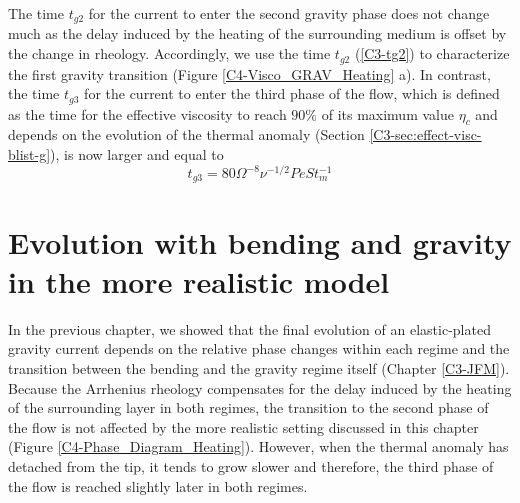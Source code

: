 The time  $t_{g2}$ for the current  to enter the second  gravity phase
does  not change  much as  the  delay induced  by the  heating of  the
surrounding medium is offset by  the change in rheology.  Accordingly,
we  use the  time $t_{g2}$  (\ref{C3-tg2}) to  characterize the  first
gravity   transition  (Figure   \ref{C4-Visco_GRAV_Heating}  a).    In
contrast, the time  $t_{g3}$ for the current to enter  the third phase
of the flow, which is defined  as the time for the effective viscosity
to  reach $90\%$  of its  maximum value  $\eta_c$ and  depends on  the
evolution       of       the      thermal       anomaly       (Section
\ref{C3-sec:effect-visc-blist-g}), is now larger and equal to
\begin{equation}
  t_{g3}= 80 \Omega^{-8}\nu^{-1/2}Pe St_m^{-1}
  \label{C4-tg3}
\end{equation}

\section{Evolution  with bending  and  gravity in  the more  realistic
  model}
\label{C4-sec:evol-with-bend}

In the  previous chapter,  we showed  that the  final evolution  of an
elastic-plated gravity  current depends on the  relative phase changes
within  each regime  and the  transition between  the bending  and the
gravity regime  itself (Chapter  \ref{C3-JFM}). Because  the Arrhenius
rheology  compensates for  the delay  induced  by the  heating of  the
surrounding layer in both regimes,  the transition to the second phase
of the flow is not affected by the more realistic setting discussed in
this  chapter (Figure  \ref{C4-Phase_Diagram_Heating}). However,  when
the thermal anomaly has detached from the tip, it tends to grow slower
and therefore, the  third phase of the flow is  reached slightly later
in both regimes.


